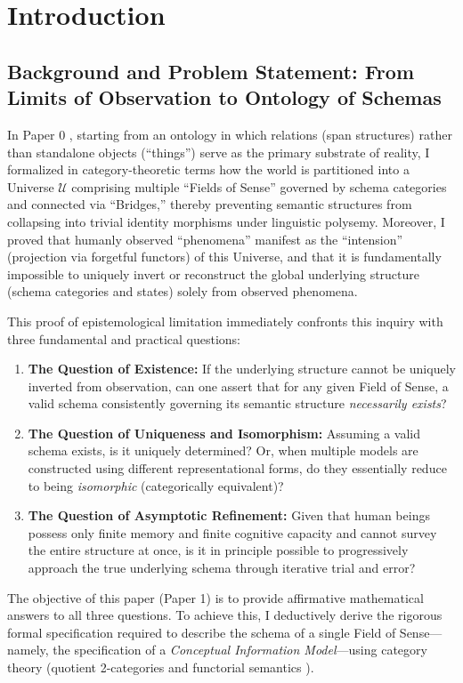 \documentclass[11pt,a4paper]{article}
\theoremstyle{definition}
\theoremstyle{plain}
\theoremstyle{remark}
\begin{document}
\section{Introduction}

\subsection{Background and Problem Statement: From Limits of Observation to Ontology of Schemas}
In Paper 0 \cite{ota2026paper0}, starting from an ontology in which relations (span structures) rather than standalone objects (``things'') serve as the primary substrate of reality, I formalized in category-theoretic terms how the world is partitioned into a Universe $\mathcal{U}$ comprising multiple ``Fields of Sense'' \cite{gabriel2015} governed by schema categories and connected via ``Bridges,'' thereby preventing semantic structures from collapsing into trivial identity morphisms under linguistic polysemy. Moreover, I proved that humanly observed ``phenomena'' manifest as the ``intension'' (projection via forgetful functors) of this Universe, and that it is fundamentally impossible to uniquely invert or reconstruct the global underlying structure (schema categories and states) solely from observed phenomena.

This proof of epistemological limitation immediately confronts this inquiry with three fundamental and practical questions:
\begin{enumerate}
    \item \textbf{The Question of Existence:} If the underlying structure cannot be uniquely inverted from observation, can one assert that for any given Field of Sense, a valid schema consistently governing its semantic structure \emph{necessarily exists}?
    \item \textbf{The Question of Uniqueness and Isomorphism:} Assuming a valid schema exists, is it uniquely determined? Or, when multiple models are constructed using different representational forms, do they essentially reduce to being \emph{isomorphic} (categorically equivalent)?
    \item \textbf{The Question of Asymptotic Refinement:} Given that human beings possess only finite memory and finite cognitive capacity and cannot survey the entire structure at once, is it in principle possible to progressively approach the true underlying schema through iterative trial and error?
\end{enumerate}

The objective of this paper (Paper 1) is to provide affirmative mathematical answers to all three questions. To achieve this, I deductively derive the rigorous formal specification required to describe the schema of a single Field of Sense---namely, the specification of a \emph{Conceptual Information Model}---using category theory (quotient 2-categories and functorial semantics \cite{maclane1998,lawvere1963}).
\end{document}
